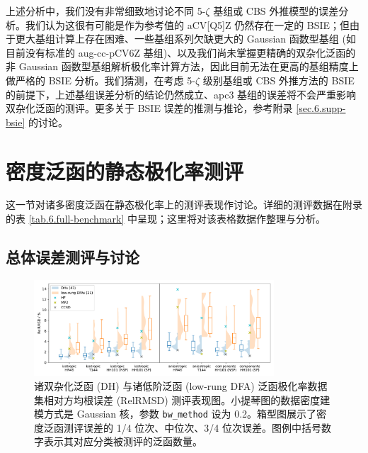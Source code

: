 上述分析中，我们没有非常细致地讨论不同 5-$\zeta$ 基组或 CBS 外推模型的误差分析。我们认为这很有可能是作为参考值的 aCV[Q5]Z 仍然存在一定的 BSIE；但由于更大基组计算上存在困难、一些基组系列欠缺更大的 Gaussian 函数型基组 (如目前没有标准的 aug-cc-pCV6Z 基组)、以及我们尚未掌握更精确的双杂化泛函的非 Gaussian 函数型基组解析极化率计算方法\cite{Brakestad-Frediani.JCTC.2020}，因此目前无法在更高的基组精度上做严格的 BSIE 分析。我们猜测，在考虑 5-$\zeta$ 级别基组或 CBS 外推方法的 BSIE 的前提下，上述基组误差分析的结论仍然成立、apc3 基组的误差将不会严重影响双杂化泛函的测评。更多关于 BSIE 误差的推测与推论，参考附录 \ref{sec.6.supp-bsie} 的讨论。

\section{密度泛函的静态极化率测评}
\label{sec.6.benchmark}

这一节对诸多密度泛函在静态极化率上的测评表现作讨论。详细的测评数据在附录的表 \ref{tab.6.full-benchmark} 中呈现；这里将对该表格数据作整理与分析。

\subsection{总体误差测评与讨论}

\begin{figure}[!hp]
    \centering
    \includegraphics[width=0.8\textwidth]{assets/benchmark-compare-dh-low.pdf}
    \caption{诸双杂化泛函 (DH) 与诸低阶泛函 (low-rung DFA) 泛函极化率数据集相对方均根误差 (RelRMSD) 测评表现图。小提琴图的数据密度建模方式是 Gaussian 核，参数 \texttt{bw\_method} 设为 0.2。箱型图展示了密度泛函测评误差的 1/4 位次、中位次、3/4 位次误差。图例中括号数字表示其对应分类被测评的泛函数量。}
    \label{fig.6.benchmark-compare-dh-low}
\end{figure}

